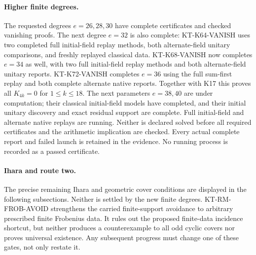 \paragraph{Higher finite degrees.}
The requested degrees $e=26,28,30$ have complete certificates and
checked vanishing proofs. The next degree $e=32$ is also complete:
KT-K64-VANISH uses two completed full initial-field replay methods,
both alternate-field unitary comparisons, and freshly replayed
classical data. KT-K68-VANISH now completes $e=34$ as well,
with two full initial-field replay methods and both alternate-field
unitary reports. KT-K72-VANISH completes $e=36$ using the full
sum-first replay and both complete alternate native reports.
Together with K17 this proves all $K_{4k}=0$ for
$1\le k\le18$. The next parameters $e=38,40$ are under
computation; their classical initial-field models have completed,
and their initial unitary discovery and exact residual support
are complete. Full initial-field and alternate native replays
are running. Neither is declared
solved before all required certificates and the arithmetic
implication are checked.
Every actual complete report and failed launch is retained in the
evidence. No running process is recorded as a passed certificate.

\paragraph{Ihara and route two.}
The precise remaining Ihara and geometric cover conditions
are displayed in the following subsections. Neither is
settled by the new finite degrees. KT-RM-FROB-AVOID strengthens
the carried finite-support avoidance to arbitrary prescribed
finite Frobenius data. It rules out the proposed finite-data
incidence shortcut, but neither produces a counterexample to
all odd cyclic covers nor proves universal existence.
Any subsequent progress
must change one of these gates, not only restate it.
